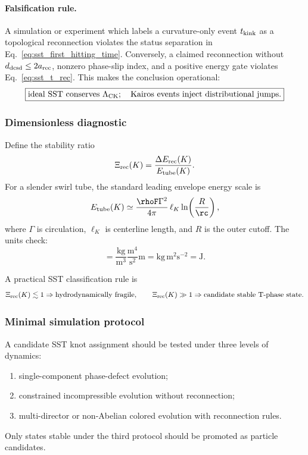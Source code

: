 \paragraph{Falsification rule.}
A simulation or experiment which labels a curvature-only event $t_{\rm kink}$ as a topological reconnection violates the status separation in Eq.~\eqref{eq:sst_first_hitting_time}. Conversely, a claimed reconnection without $d_{\rm dcsd}\le2a_{\rm rec}$, nonzero phase-slip index, and a positive energy gate violates Eq.~\eqref{eq:sst_t_rec}. This makes the conclusion operational:
\begin{equation}
    \boxed{
    \text{ideal SST conserves }\Lambda_{\rm CK};
    \quad
    \text{Kairos events inject distributional jumps.}
    }
    \label{eq:sst_ck_kairos_conclusion}
\end{equation}

\subsubsection{Dimensionless diagnostic}
Define the stability ratio
\begin{equation}
    \Xi_{\rm rec}(K)
    = \frac{\Delta E_{\rm rec}(K)}{E_{\rm tube}(K)}.
    \label{eq:xi_reconnection}
\end{equation}
For a slender swirl tube, the standard leading envelope energy scale is
\begin{equation}
    E_{\rm tube}(K)
    \simeq
    \frac{\rhoF\Gamma^2}{4\pi}\,\ell_K\ln\!\left(\frac{R}{\rc}\right),
    \label{eq:slender_tube_energy_scale}
\end{equation}
where $\Gamma$ is circulation, $\ell_K$ is centerline length, and $R$ is the outer cutoff. The units check:
\begin{equation}
    [\rhoF\Gamma^2\ell_K]
    = \frac{\mathrm{kg}}{\mathrm m^3}\frac{\mathrm m^4}{\mathrm s^2}\mathrm m
    = \mathrm{kg}\,\mathrm m^2\mathrm s^{-2}=\mathrm J.
\end{equation}

A practical SST classification rule is
\begin{equation}
    \Xi_{\rm rec}(K)\lesssim 1 \Rightarrow \text{hydrodynamically fragile},
    \qquad
    \Xi_{\rm rec}(K)\gg 1 \Rightarrow \text{candidate stable T-phase state}.
\end{equation}

\subsubsection{Minimal simulation protocol}
A candidate SST knot assignment should be tested under three levels of dynamics:
\begin{enumerate}
    \item single-component phase-defect evolution;
    \item constrained incompressible evolution without reconnection;
    \item multi-director or non-Abelian colored evolution with reconnection rules.
\end{enumerate}
Only states stable under the third protocol should be promoted as particle candidates.

